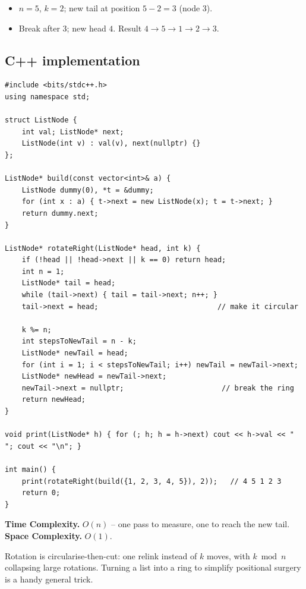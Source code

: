 
\begin{itemize}
  \item $n=5$, $k=2$; new tail at position $5-2=3$ (node $3$).
  \item Break after $3$; new head $4$. Result $4\to5\to1\to2\to3$.
\end{itemize}

\subsection*{C++ implementation}

\begin{lstlisting}
#include <bits/stdc++.h>
using namespace std;

struct ListNode {
    int val; ListNode* next;
    ListNode(int v) : val(v), next(nullptr) {}
};

ListNode* build(const vector<int>& a) {
    ListNode dummy(0), *t = &dummy;
    for (int x : a) { t->next = new ListNode(x); t = t->next; }
    return dummy.next;
}

ListNode* rotateRight(ListNode* head, int k) {
    if (!head || !head->next || k == 0) return head;
    int n = 1;
    ListNode* tail = head;
    while (tail->next) { tail = tail->next; n++; }
    tail->next = head;                            // make it circular

    k %= n;
    int stepsToNewTail = n - k;
    ListNode* newTail = head;
    for (int i = 1; i < stepsToNewTail; i++) newTail = newTail->next;
    ListNode* newHead = newTail->next;
    newTail->next = nullptr;                       // break the ring
    return newHead;
}

void print(ListNode* h) { for (; h; h = h->next) cout << h->val << " "; cout << "\n"; }

int main() {
    print(rotateRight(build({1, 2, 3, 4, 5}), 2));   // 4 5 1 2 3
    return 0;
}
\end{lstlisting}

\begin{complexitybox}
\textbf{Time Complexity.} $O(n)$ -- one pass to measure, one to reach the
new tail. \textbf{Space Complexity.} $O(1)$.
\end{complexitybox}

\begin{takeawaybox}
Rotation is circularise-then-cut: one relink instead of $k$ moves, with
$k \bmod n$ collapsing large rotations. Turning a list into a ring to
simplify positional surgery is a handy general trick.
\end{takeawaybox}
